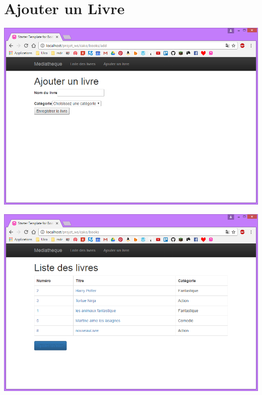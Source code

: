 \documentclass{report}
\begin{document}
		\section{Ajouter un Livre}
		\begin{center}
			\includegraphics[scale=0.5]{img/manuel/DetailAjouterLivre.png}  
		\end{center}
		
		\begin{center}
			\includegraphics[scale=0.5]{img/manuel/DetailAjouterLivre_ajoutdunouveaulivre.png}  
		\end{center}
	
\end{document}
